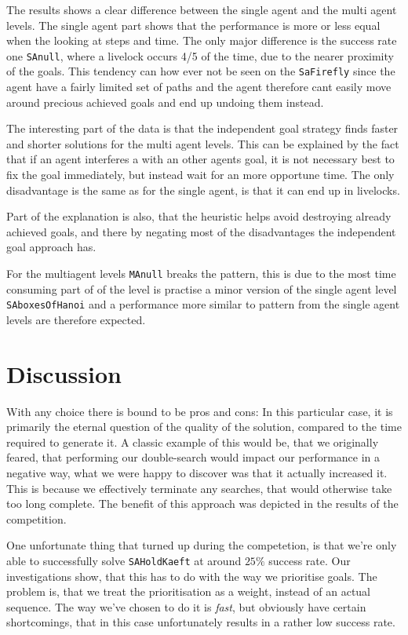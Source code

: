 \documentclass[letterpaper]{article}
\begin{document}
		The results shows a clear difference between the single agent and the multi agent levels. 
		The single agent part shows that the performance is more or less equal when the looking at steps and time. The only major difference is the success rate one \verb=SAnull=, where a livelock occurs 4/5 of the time, due to the nearer proximity of the goals. This tendency can how ever not be seen on the \verb|SaFirefly| since the agent have a fairly limited set of paths and the agent therefore cant easily move around precious achieved goals and end up undoing them instead.
		
		The interesting part of the data is that the independent goal strategy finds faster and shorter solutions for the multi agent levels. This can be explained by the fact that if an agent interferes a with an other agents goal, it is not necessary best to fix the goal immediately, but instead wait for an more opportune time.	The only disadvantage is the same as for the single agent, is that it can end up in livelocks.
		
		Part of the explanation is also, that the heuristic helps avoid destroying already achieved goals, and there by negating most of the disadvantages the independent goal approach has. 
		
		For the multiagent levels \verb|MAnull| breaks the pattern, this is due to the most time consuming part of of the level is practise a minor version of the single agent level \verb|SAboxesOfHanoi| and a performance more similar to pattern from the single agent levels are therefore expected.
	
	
\section{Discussion}
	\label{disscussion}
	With any choice there is bound to be pros and cons: In this particular case, it is primarily the eternal question of the quality of the solution, compared to the time required to generate it. A classic example of this would be, that we originally feared, that performing our double-search would impact our performance in a negative way, what we were happy to discover was that it actually increased it. This is because we effectively terminate any searches, that would otherwise take too long complete. The benefit of this approach was depicted in the results of the competition. 


	One unfortunate thing that turned up during the competetion, is that we're only able to successfully solve \verb=SAHoldKaeft= at around $25\%$ success rate. Our investigations show, that this has to do with the way we prioritise goals. The problem is, that we treat the prioritisation as a weight, instead of an actual sequence. The way we've chosen to do it is \emph{fast}, but obviously have certain shortcomings, that in this case unfortunately results in a rather low success rate. 
\end{document}
